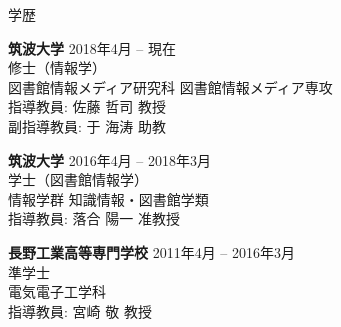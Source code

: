 \documentclass{resume} %
\begin{document}

\begin{rSection}{学歴}

    {\bf 筑波大学} \hfill {2018年4月 -- 現在}
    \\ 修士（情報学）
    \\ 図書館情報メディア研究科 図書館情報メディア専攻
    \\ 指導教員: 佐藤 哲司 教授
    \\ 副指導教員: 于 海涛 助教

    {\bf 筑波大学} \hfill {2016年4月 -- 2018年3月}
    \\ 学士（図書館情報学）
    \\ 情報学群 知識情報・図書館学類
    \\ 指導教員: 落合 陽一 准教授

    {\bf 長野工業高等専門学校} \hfill {2011年4月 -- 2016年3月}
    \\ 準学士
    \\ 電気電子工学科
    \\ 指導教員: 宮崎 敬 教授

\end{rSection}

\end{document}
